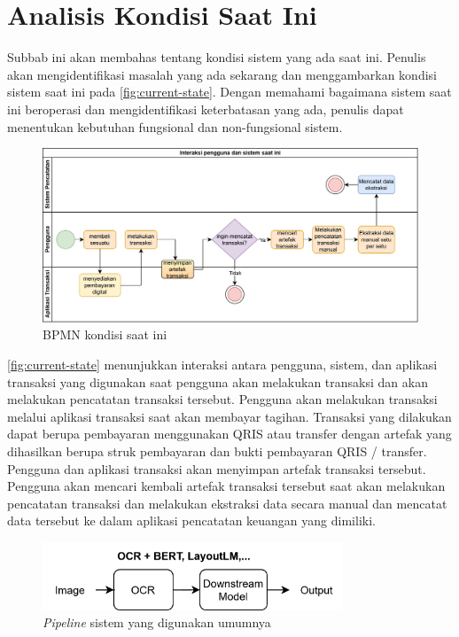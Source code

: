 \section{Analisis Kondisi Saat Ini}
\label{sec:analisis-kondisi-saat-ini}

Subbab ini akan membahas tentang kondisi sistem yang ada saat ini. Penulis akan mengidentifikasi masalah yang ada sekarang dan menggambarkan kondisi sistem saat ini pada \autoref{fig:current-state}. Dengan memahami bagaimana sistem saat ini beroperasi dan mengidentifikasi keterbatasan yang ada, penulis dapat menentukan kebutuhan fungsional dan non-fungsional sistem.

\begin{figure}[htbp]
    \centering
    \includegraphics[width=1\textwidth]{images/current-state.png}
    \caption{BPMN kondisi saat ini}
    \label{fig:current-state}
\end{figure}

\autoref{fig:current-state} menunjukkan interaksi antara pengguna, sistem, dan aplikasi transaksi yang digunakan saat pengguna akan melakukan transaksi dan akan melakukan pencatatan transaksi tersebut. Pengguna akan melakukan transaksi melalui aplikasi transaksi saat akan membayar tagihan. Transaksi yang dilakukan dapat berupa pembayaran menggunakan QRIS atau transfer dengan artefak yang dihasilkan berupa struk pembayaran dan bukti pembayaran QRIS / transfer. Pengguna dan aplikasi transaksi akan menyimpan artefak transaksi tersebut. Pengguna akan mencari kembali artefak transaksi tersebut saat akan melakukan pencatatan transaksi dan melakukan ekstraksi data secara manual dan mencatat data tersebut ke dalam aplikasi pencatatan keuangan yang dimiliki.

\begin{figure}[htbp]
    \centering
    \includegraphics[width=0.8\textwidth]{images/non-donut-pipeline.png}
    \caption{\emph{Pipeline} sistem yang digunakan umumnya}
    \label{fig:non-donut-pipeline}
\end{figure}


